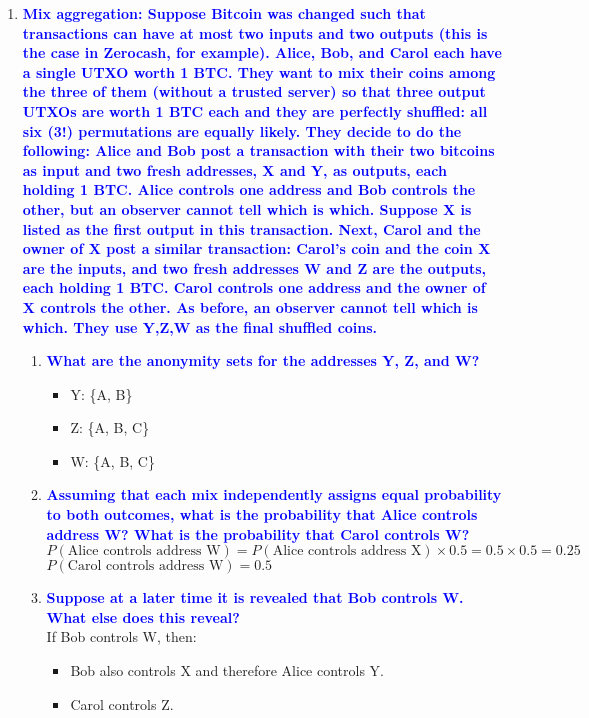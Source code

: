 \documentclass[11pt]{article}
\begin{document}
\begin{enumerate}
    
\item \textbf{\textcolor{blue}{Mix aggregation: Suppose Bitcoin was changed such that transactions can have at most two inputs and two outputs (this is the case in Zerocash, for example). Alice, Bob, and Carol each have a single UTXO worth 1 BTC. They want to mix their coins among the three of them (without a trusted server) so that three output UTXOs are worth 1 BTC each and they are perfectly shuffled: all six (3!) permutations are equally likely. They decide to do the following: Alice and Bob post a transaction with their two bitcoins as input and two fresh addresses, X and Y, as outputs, each holding 1 BTC. Alice controls one address and Bob controls the other, but an observer cannot tell which is which. Suppose X is listed as the first output in this transaction. Next, Carol and the owner of X post a similar transaction: Carol's coin and the coin X are the inputs, and two fresh addresses W and Z are the outputs, each holding 1 BTC. Carol controls one address and the owner of X controls the other. As before, an observer cannot tell which is which. They use Y,Z,W as the final shuffled coins.}}
\begin{center}
\end{center}
    \begin{enumerate}
        \item \textbf{\textcolor{blue}{What are the anonymity sets for the addresses Y, Z, and W?}}
            \begin{itemize}
                \item Y: \{A, B\}
                \item Z: \{A, B, C\}
                \item W: \{A, B, C\}
            \end{itemize}
            
        \item \textbf{\textcolor{blue}{Assuming that each mix independently assigns equal probability to both outcomes, what is the probability that Alice controls address W? What is the probability that Carol controls W?}}
            \\ $P(\text{Alice controls address W}) = P(\text{Alice controls address X}) \times 0.5 = 0.5 \times 0.5 = 0.25$
            \\ $P(\text{Carol controls address W}) = 0.5$
            
        \item \textbf{\textcolor{blue}{Suppose at a later time it is revealed that Bob controls W. What else does this reveal?}}
            \\ If Bob controls W, then:
            \begin{itemize}
                \item Bob also controls X and therefore Alice controls Y.
                \item Carol controls Z.
            \end{itemize}
            

\end{enumerate}
\end{enumerate}
\end{document}
